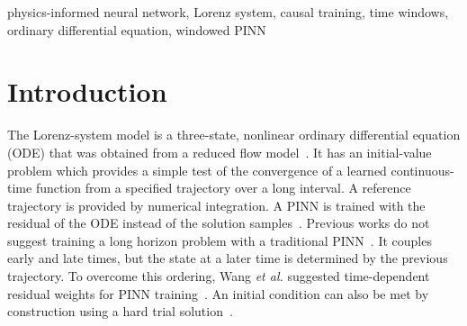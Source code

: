 \documentclass[conference]{IEEEtran}
\begin{document}
\begin{abstract}
We study a physics-informed neural network (PINN) approximation of a single nearly closed orbit of the Lorenz three-state system on $t\in[0,13.26446]$. We trained a single network on the full interval that produces a combined state root-mean-square error (RMSE) of 2.237. To address this long horizon problem, we divide the interval into 27 windows. Each window has a separate network and an initial state that is fixed to the predicted endpoint of the previous window. In each window, Adam reduces the residual in four stages. In each stage, we use causal weights and causal weighted loss to reduce the loss of all earlier points. Then, L-BFGS minimizes the loss using the unweighted residual mean. A numerical reference is used to monitor the training but is not used for optimization or stopping. In the seed-0 run, the windowed model gives a combined RMSE of $6.97\times10^{-5}$ on 13,265 evaluation times and a dense-grid residual mean square of $1.87\times10^{-7}$. Across five seeds, the median RMSE is $8.13\times10^{-5}$. The full-interval and windowed runs also vary in number of parameters, sampling and optimizer schedule, so we describe them as different configurations. Ablations show that separate window networks and warm start are needed. Without causal weighting the median RMSE is 2.3 times larger, but with three to five seeds this difference is not significant.

\end{abstract}

\begin{IEEEkeywords}
physics-informed neural network, Lorenz system, causal training, time windows, ordinary differential equation, windowed PINN
\end{IEEEkeywords}

\section{Introduction}
The Lorenz-system model is a three-state, nonlinear ordinary differential equation (ODE) that was obtained from a reduced flow model~\cite{lorenz1960}. It has an initial-value problem which provides a simple test of the convergence of a learned continuous-time function from a specified trajectory over a long interval. A reference trajectory is provided by numerical integration. A PINN is trained with the residual of the ODE instead of the solution samples~\cite{raissi2019}. Previous works do not suggest training a long horizon problem with a traditional PINN~\cite{wang2024causal}. It couples early and late times, but the state at a later time is determined by the previous trajectory. To overcome this ordering, Wang \emph{et al.} suggested time-dependent residual weights for PINN training~\cite{wang2024causal}. An initial condition can also be met by construction using a hard trial solution~\cite{lagaris1998}.
\end{document}
